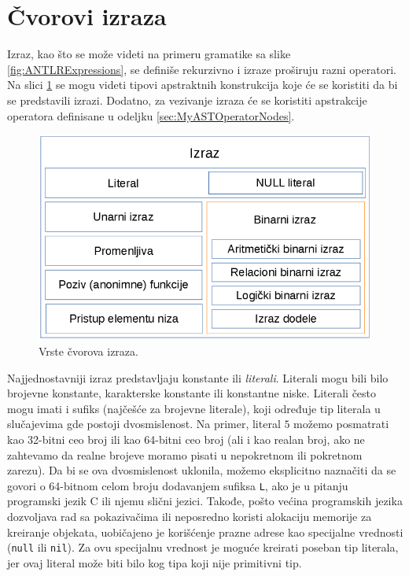 \section{Čvorovi izraza}
\label{sec:MyASTExpressionNodes}

Izraz, kao što se može videti na primeru gramatike sa slike \ref{fig:ANTLRExpressions}, se definiše rekurzivno i izraze proširuju razni operatori. Na slici \ref{fig:ExpressionNodes} se mogu videti tipovi apstraktnih konstrukcija koje će se koristiti da bi se predstavili izrazi. Dodatno, za vezivanje izraza će se koristiti apstrakcije operatora definisane u odeljku \ref{sec:MyASTOperatorNodes}.

\begin{figure}[h!]
    \centering
        \includegraphics[scale=0.7]{images/expression_nodes.png}
    \caption{Vrste čvorova izraza.}
    \label{fig:ExpressionNodes}
\end{figure}

Najjednostavniji izraz predstavljaju konstante ili \emph{literali}. Literali mogu bili bilo brojevne konstante, karakterske konstante ili konstantne niske. Literali često mogu imati i sufiks (najčešće za brojevne literale), koji određuje tip literala u slučajevima gde postoji dvosmislenost. Na primer, literal $5$ možemo posmatrati kao 32-bitni ceo broj ili kao 64-bitni ceo broj (ali i kao realan broj, ako ne zahtevamo da realne brojeve moramo pisati u nepokretnom ili pokretnom zarezu). Da bi se ova dvosmislenost uklonila, možemo eksplicitno naznačiti da se govori o 64-bitnom celom broju dodavanjem sufiksa \texttt{L}, ako je u pitanju programski jezik C ili njemu slični jezici. Takođe, pošto većina programskih jezika dozvoljava rad sa pokazivačima ili neposredno koristi alokaciju memorije za kreiranje objekata, uobičajeno je korišćenje prazne adrese kao specijalne vrednosti (\texttt{null} ili \texttt{nil}). Za ovu specijalnu vrednost je moguće kreirati poseban tip literala, jer ovaj literal može biti bilo kog tipa koji nije primitivni tip.

